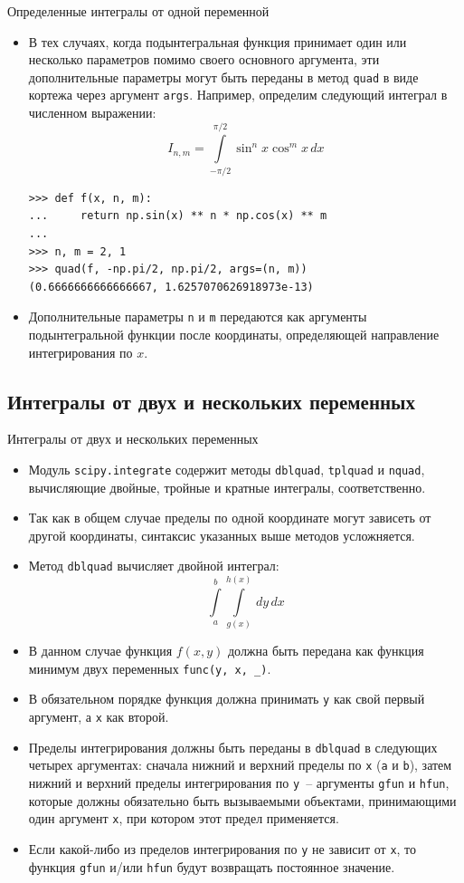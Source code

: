 \documentclass[aspectratio=169, mathserif]{beamer}	%
\begin{document}
\begin{frame}[fragile, label=c]{Определенные интегралы от одной переменной}
\scriptsize
\begin{itemize}
	\item В тех случаях, когда подынтегральная функция принимает один или несколько параметров помимо своего основного аргумента, эти дополнительные параметры могут быть переданы в метод \texttt{quad} в виде кортежа через аргумент \texttt{args}.
	Например, определим следующий интеграл в численном выражении:
\vfill
$$
	I_{n,m} = \int\limits_{-\pi/2}^{\pi/2}\sin^nx\cos^mx\, dx
$$
\vfill
\begin{verbatim}
>>> def f(x, n, m):
...     return np.sin(x) ** n * np.cos(x) ** m
...
>>> n, m = 2, 1
>>> quad(f, -np.pi/2, np.pi/2, args=(n, m))
(0.6666666666666667, 1.6257070626918973e-13)
\end{verbatim}
\vfill
	\item Дополнительные параметры \texttt{n} и \texttt{m} передаются как аргументы подынтегральной функции после координаты, определяющей направление интегрирования по $x$.
\end{itemize}
\vfill
\end{frame}

\subsection{Интегралы от двух и нескольких переменных}
\begin{frame}[fragile, label=c]{Интегралы от двух и нескольких переменных}
\scriptsize
\begin{itemize}
	\item Модуль \texttt{scipy.integrate} содержит методы \texttt{dblquad}, \texttt{tplquad} и \texttt{nquad}, вычисляющие двойные, тройные и кратные интегралы, соответственно.
	\item Так как в общем случае пределы по одной координате могут зависеть от другой координаты, синтаксис указанных выше методов усложняется.
	\item Метод \texttt{dblquad} вычисляет двойной интеграл:
\vfill
$$
	\int\limits_{a}^{b}\int\limits_{g(x)}^{h(x)} \, dy \, dx
$$
\vfill
	\item В данном случае функция $f(x,y)$ должна быть передана как функция минимум двух переменных \texttt{func(y, x, \_)}.
	\item В обязательном порядке функция должна принимать \texttt{y} как свой первый аргумент, а \texttt{x} как второй.
	\item Пределы интегрирования должны быть переданы в \texttt{dblquad} в следующих четырех аргументах: сначала нижний и верхний пределы по \texttt{x} (\texttt{a} и \texttt{b}), затем нижний и верхний пределы интегрирования по \texttt{y}~-- аргументы \texttt{gfun} и \texttt{hfun}, которые должны обязательно быть вызываемыми объектами, принимающими один аргумент \texttt{x}, при котором этот предел применяется.
	\item Если какой-либо из пределов интегрирования по \texttt{y} не зависит от \texttt{x}, то функция \texttt{gfun} и/или \texttt{hfun} будут возвращать постоянное значение.
\end{itemize}
\vfill
\end{frame}
\end{document}
